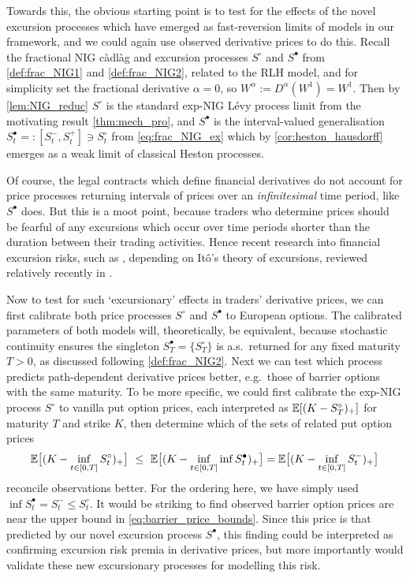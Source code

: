 Towards this, the obvious starting point is to test for the effects of the novel excursion processes which have emerged as fast-reversion limits of models in our framework, and we could again use observed derivative prices to do this. Recall the fractional NIG c\`adl\`ag and excursion processes $S^\circ$ and $S^\bullet$ from \autoref{def:frac_NIG1} and \autoref{def:frac_NIG2}, related to the RLH model, and for simplicity set the fractional derivative $\alpha=0$, so $W^\alpha\!:=\!D^\alpha(W^1)\!=\!W^1$. Then by \autoref{lem:NIG_reduc} $S^\circ$ is the standard exp-NIG L\'evy process limit from the motivating result \autoref{thm:mech_pro}, and $S^\bullet$ is the interval-valued generalisation $S^\bullet_t=:[S^-_t,S^+_t]\ni S^\circ_t$ from \autoref{eq:frac_NIG_ex} which by \autoref{cor:heston_hausdorff} emerges as a weak limit of classical Heston processes.

Of course, the legal contracts which define financial derivatives do not account for price processes returning intervals of prices over an \emph{infinitesimal} time period, like $S^\bullet$ does. But this is a moot point, because traders who determine prices should be fearful of any excursions which occur over time periods shorter than the duration between their trading activities. Hence recent research into financial excursion risks, such as \cite{ananova_2020}, depending on It\^o's theory of excursions, reviewed relatively recently in \cite{watanabe_2010}.

Now to test for such `excursionary' effects in traders' derivative prices, we can first calibrate both price processes $S^\circ$ and $S^\bullet$ to European options. The calibrated parameters of both models will, theoretically, be equivalent, because stochastic continuity ensures the singleton $S^\bullet_T = \{S^\circ_T\}$ is a.s.~returned for any fixed maturity $T>0$, as discussed following \autoref{def:frac_NIG2}. Next we can test which process predicts path-dependent derivative prices better, e.g.~those of barrier options with the same maturity. To be more specific, we could first calibrate the exp-NIG process $S^\circ$ to vanilla put option prices, each interpreted as $\mathbb{E}[(K - S^\circ_T)_+]$ for maturity $T$ and strike $K$, then determine which of the sets of related put option prices
\begin{equation}\label{eq:barrier_price_bounds}
    \mathbb{E}\big[(K - \inf_{t\in[0,T]}S^\circ_t)_+\big]\ \le\ \mathbb{E}\big[(K - \inf_{t\in[0,T]}\inf S^\bullet_t)_+\big] = \mathbb{E}\big[(K - \inf_{t\in[0,T]}S^-_t)_+\big]
\end{equation}
reconcile observations better. For the ordering here, we have simply used $\inf S^\bullet_t = S^-_t \le S^\circ_t$. It would be striking to find observed barrier option prices are near the upper bound in \autoref{eq:barrier_price_bounds}. Since this price is that predicted by our novel excursion process $S^\bullet$, this finding could be interpreted as confirming excursion risk premia in derivative prices, but more importantly would validate these new excursionary processes for modelling this risk.
